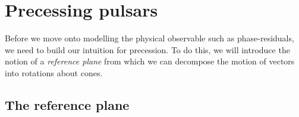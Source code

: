 \documentclass[../full_thesis/full_thesis.tex]{subfiles}
\begin{document}
%




\section{Precessing pulsars}
\label{sec: precessing pulsars}
Before we move onto modelling the physical observable such as phase-residuals,
we need to build our intuition for precession. To do this, we will introduce
the notion of a \emph{reference plane} from which we can decompose the motion of
vectors into rotations about cones.

\subsection{The reference plane}
\label{sec: reference plane}
\end{document}
